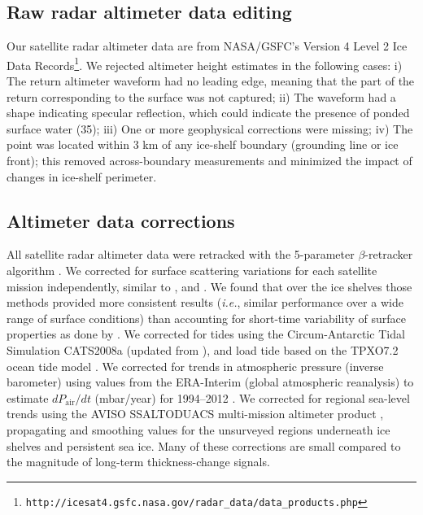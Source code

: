 \subsection*{Raw radar altimeter data editing}

Our satellite radar altimeter data are from NASA/GSFC's Version 4 Level 2 Ice
Data Records\footnote{\tt http://icesat4.gsfc.nasa.gov/radar\_data/data\_products.php}.
We rejected altimeter height estimates in the following cases: i) The return
altimeter waveform had no leading edge, meaning that the part of the return 
corresponding to the surface was not captured; ii) The waveform had a shape 
indicating specular reflection, which could indicate the presence of ponded 
surface water (35); iii) One or more geophysical corrections were missing; 
iv) The point was located within 3 km of any ice-shelf boundary (grounding 
line or ice front); this removed across-boundary measurements and minimized 
the impact of changes in ice-shelf perimeter.

\subsection*{Altimeter data corrections}

All satellite radar altimeter data were retracked with the 5-parameter 
$\beta$-retracker algorithm \parencite{Brenner1983}. We corrected for surface
scattering variations for each satellite mission independently, similar to 
\textcite{Zwally2005, Davis2004}, and \textcite{Wingham2009}. We found that
over the ice shelves those methods provided more consistent results ({\it i.e.}, 
similar performance over a wide range of surface conditions) than accounting 
for short-time variability of surface properties as done by 
\textcite{Khvorostovsky2012}. We corrected for tides using the Circum-Antarctic
Tidal Simulation CATS2008a (updated from \textcite{Padman2002}), and load tide
based on the TPXO7.2 ocean tide model \parencite{Egbert2002}. We corrected for
trends in atmospheric pressure (inverse barometer) using values from the 
ERA-Interim (global atmospheric reanalysis) to estimate $dP_{\text{air}}/dt$
(mbar/year) for 1994--2012 \parencite{Padman2003}. We corrected for regional
sea-level trends using the AVISO SSALTO\/DUACS multi-mission altimeter product
\parencite{LeTraon1998}, propagating and smoothing values for the unsurveyed
regions underneath ice shelves and persistent sea ice. Many of these
corrections are small compared to the magnitude of long-term thickness-change
signals.

